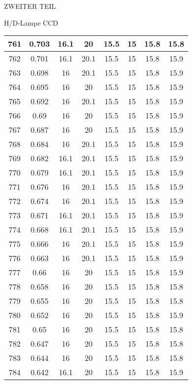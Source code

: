 \begin{appendix}
\begin{chapter}{ZWEITER TEIL}
\begin{section}{H/D-Lampe CCD}
\begin{scriptsize}
\begin{longtable}[htbp]{|c|c|c|c|c|c|c|c|}
            761 & 0.703 & 16.1 & 20 & 15.5 & 15 & 15.8 & 15.8 \\ \hline
            762 & 0.701 & 16.1 & 20.1 & 15.5 & 15 & 15.8 & 15.9 \\ \hline
            763 & 0.698 & 16 & 20.1 & 15.5 & 15 & 15.8 & 15.9 \\ \hline
            764 & 0.695 & 16 & 20 & 15.5 & 15 & 15.8 & 15.9 \\ \hline
            765 & 0.692 & 16 & 20.1 & 15.5 & 15 & 15.8 & 15.9 \\ \hline
            766 & 0.69 & 16 & 20 & 15.5 & 15 & 15.8 & 15.9 \\ \hline
            767 & 0.687 & 16 & 20 & 15.5 & 15 & 15.8 & 15.9 \\ \hline
            768 & 0.684 & 16 & 20.1 & 15.5 & 15 & 15.8 & 15.9 \\ \hline
            769 & 0.682 & 16.1 & 20.1 & 15.5 & 15 & 15.8 & 15.9 \\ \hline
            770 & 0.679 & 16.1 & 20.1 & 15.5 & 15 & 15.8 & 15.9 \\ \hline
            771 & 0.676 & 16 & 20.1 & 15.5 & 15 & 15.8 & 15.9 \\ \hline
            772 & 0.674 & 16 & 20.1 & 15.5 & 15 & 15.8 & 15.9 \\ \hline
            773 & 0.671 & 16.1 & 20.1 & 15.5 & 15 & 15.8 & 15.9 \\ \hline
            774 & 0.668 & 16.1 & 20.1 & 15.5 & 15 & 15.8 & 15.9 \\ \hline
            775 & 0.666 & 16 & 20.1 & 15.5 & 15 & 15.8 & 15.9 \\ \hline
            776 & 0.663 & 16 & 20.1 & 15.5 & 15 & 15.8 & 15.9 \\ \hline
            777 & 0.66 & 16 & 20 & 15.5 & 15 & 15.8 & 15.9 \\ \hline
            778 & 0.658 & 16 & 20 & 15.5 & 15 & 15.8 & 15.8 \\ \hline
            779 & 0.655 & 16 & 20 & 15.5 & 15 & 15.8 & 15.8 \\ \hline
            780 & 0.652 & 16 & 20 & 15.5 & 15 & 15.8 & 15.9 \\ \hline
            781 & 0.65 & 16 & 20 & 15.5 & 15 & 15.8 & 15.8 \\ \hline
            782 & 0.647 & 16 & 20 & 15.5 & 15 & 15.8 & 15.8 \\ \hline
            783 & 0.644 & 16 & 20 & 15.5 & 15 & 15.8 & 15.8 \\ \hline
            784 & 0.642 & 16.1 & 20 & 15.5 & 15 & 15.8 & 15.9 \\ \hline

\end{longtable}
\end{scriptsize}
\end{section}
\end{chapter}
\end{appendix}
